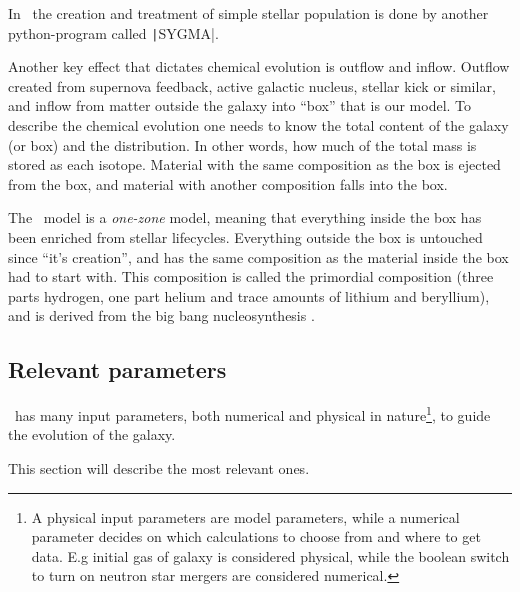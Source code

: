 In \omegamodel\ the creation and treatment of simple stellar population is done by another python-program called \texttt|SYGMA|.

Another key effect that dictates chemical evolution is outflow and inflow. Outflow created from supernova feedback, active galactic nucleus, stellar kick or similar, and inflow from matter outside the galaxy into ``box'' that is our model.
To describe the chemical evolution one needs to know the total content of the galaxy (or box) and the distribution. In other words, how much of the total mass is stored as each isotope. Material with the same composition as the box is ejected from the box, and material with another composition falls into the box.

The \omegamodel\ model is a \textit{one-zone} model, meaning that everything inside the box has been enriched from stellar lifecycles. Everything outside the box is untouched since ``it's creation'', and has the same composition as the material inside the box had to start with.
This composition is called the primordial composition (three parts hydrogen, one part helium and trace amounts of lithium and beryllium), and is derived from the big bang nucleosynthesis .


\subsection{Relevant parameters}
\label{sec:omega-parameters}
\omegamodel\ has many input parameters, both numerical and physical in nature\footnote{A physical input parameters are model parameters, while a numerical parameter decides on which calculations to choose from and where to get data. E.g initial gas of galaxy is considered physical, while the boolean switch to turn on neutron star mergers are considered numerical.}, to guide the evolution of the galaxy.

This section will describe the most relevant ones.

